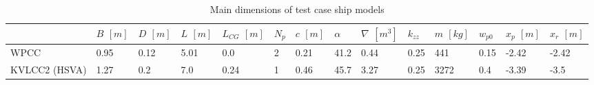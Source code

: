 \begin{table}[h]
    \footnotesize
    \caption{Main dimensions of test case ship models}
    \label{tab:cases}

    \centering
    \begin{tabular}{|p{1.5cm}|p{0.5cm}|p{0.5cm}|p{0.5cm}|p{0.5cm}|p{0.5cm}|p{0.5cm}|p{0.5cm}| p{0.5cm}|p{0.5cm}|p{0.5cm}|p{0.5cm}|p{0.9cm}|p{0.9cm}|}
\hline
&

\(B\) \([m]\)
&

\(D\) \([m]\)
&

\(L\) \([m]\)
&

\(L_{CG}\) \([m]\)
&

\(N_p\)
&

\(c\) \([m]\)
&

\(\alpha\)
&

\(\nabla\) \([m^3]\)
&

\(k_{zz}\)
&

\(m\) \([kg]\)
&

\(w_{p0}\)
&

\(x_{p}\) \([m]\)
&

\(x_{r}\) \([m]\)
\\
\hline
WPCC
&

0.95
&

0.12
&

5.01
&

0.0
&

2
&

0.21
&

41.2
&

0.44
&

0.25
&

441
&

0.15
&

-2.42
&

-2.42
\\

KVLCC2 (HSVA)
&

1.27
&

0.2
&

7.0
&

0.24
&

1
&

0.46
&

45.7
&

3.27
&

0.25
&

3272
&

0.4
&

-3.39
&

-3.5
\\
\hline
\end{tabular}
\end{table}
